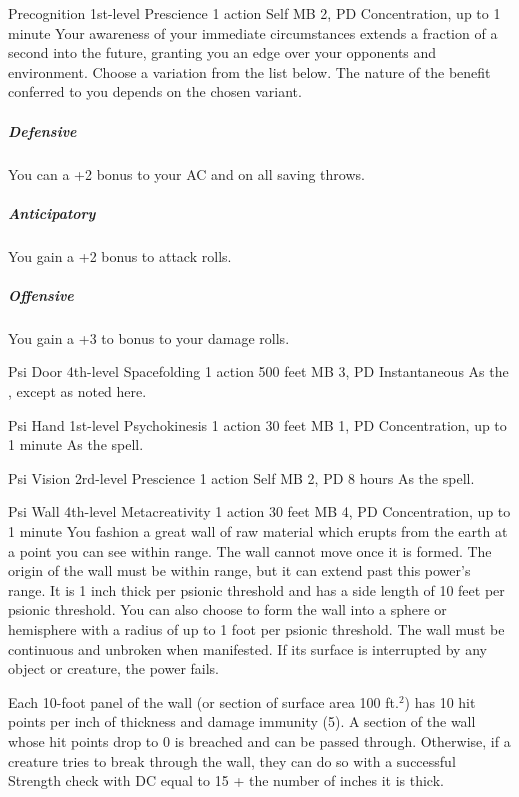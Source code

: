 \DndPowerHeader%
  {Precognition}
  {1st-level Prescience}
  {1 action}
  {Self}
  {MB 2, PD \lvlone}
  {Concentration, up to 1 minute}
Your awareness of your immediate circumstances extends
a fraction of a second into the future,
granting you an edge over your opponents and environment.
Choose a variation from the list below.
The nature of the benefit conferred to you
depends on the chosen variant.
\subparagraph{Defensive}
  You can a +2 bonus to your AC and on all saving throws.
\subparagraph{Anticipatory}
  You gain a +2 bonus to attack rolls.
\subparagraph{Offensive}
  You gain a +3 to bonus to your damage rolls.

\DndPowerHeader%
  {Psi Door}
  {4th-level Spacefolding}
  {1 action}
  {500 feet}
  {MB 3, PD \lvlfour}
  {Instantaneous}
As the , except as noted here.

\DndPowerHeader%
  {Psi Hand}
  {1st-level Psychokinesis}
  {1 action}
  {30 feet}
  {MB 1, PD \lvlone}
  {Concentration, up to 1 minute}
As the  spell.

\DndPowerHeader%
  {Psi Vision}
  {2rd-level Prescience}
  {1 action}
  {Self}
  {MB 2, PD \lvltwo}
  {8 hours}
As the  spell.

\DndPowerHeader%
  {Psi Wall}
  {4th-level Metacreativity}
  {1 action}
  {30 feet}
  {MB 4, PD \lvlfour}
  {Concentration, up to 1 minute}
You fashion a great wall of raw material which erupts from the earth
at a point you can see within range.
The wall cannot move once it is formed.
The origin of the wall must be within range,
but it can extend past this power's range.
It is 1 inch thick per psionic threshold
and has a side length of 10 feet per psionic threshold.
You can also choose to form the wall into a sphere or hemisphere
with a radius of up to 1 foot per psionic threshold.
The wall must be continuous and unbroken when manifested.
If its surface is interrupted by any object or creature,
the power fails.

Each 10-foot panel of the wall
(or section of surface area 100 ft.$^2$)
has 10 hit points per inch of thickness
and damage immunity (5).
A section of the wall whose hit points drop to 0 is breached
and can be passed through.
Otherwise, if a creature tries to break through the wall,
they can do so with a successful Strength check with
DC equal to 15 + the number of inches it is thick.

